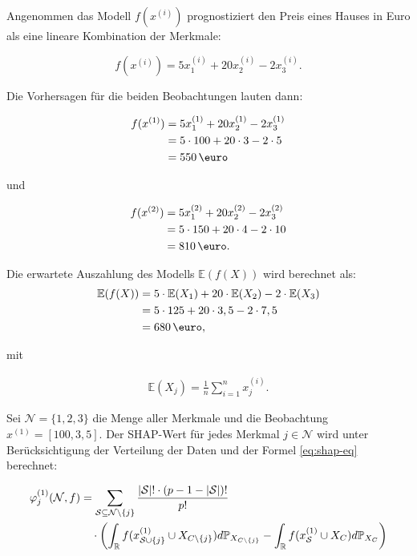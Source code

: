 Angenommen das Modell $f(x^{(i)})$ prognostiziert den Preis eines Hauses in Euro als eine lineare Kombination der Merkmale:

\begin{equation}
    f(x^{(i)}) = 5x_1^{(i)} + 20x_2^{(i)} - 2x_3^{(i)}.
\end{equation}

Die Vorhersagen für die beiden Beobachtungen lauten dann:

\begin{align}
    \label{eq:fx1}
    f(x^{(1)}) &= 5x_1^{(1)} + 20x_2^{(1)} - 2x_3^{(1)} \\ \notag
        &= 5 \cdot 100 + 20 \cdot 3 - 2 \cdot 5 \\ \notag
        &= 550\,\text{\euro} 
\end{align}

und 

\begin{align}
    f(x^{(2)}) &= 5x_1^{(2)} + 20x_2^{(2)} - 2x_3^{(2)} \\ \notag
        &= 5 \cdot 150 + 20 \cdot 4 - 2 \cdot 10 \\ \notag
        &= 810\,\text{\euro}. 
\end{align}

Die erwartete Auszahlung des Modells $\mathbb{E}(f(X))$ wird berechnet als:
\begin{align}
    \label{eq:efx}
    \mathbb{E}(f(X)) &= 5 \cdot \mathbb{E}(X_1) + 20 \cdot \mathbb{E}(X_2) - 2 \cdot \mathbb{E}(X_3) \\ \notag
                     &= 5 \cdot 125 + 20 \cdot 3,5 - 2 \cdot 7,5 \\ \notag
                     &= 680 \,\text{\euro},
\end{align}

mit 

\begin{align}
    \label{eq:e}
    \mathbb{E}(X_j) = \frac{1}{n} \sum_{i=1}^{n} x_j^{(i)}.
\end{align}     

Sei $\mathcal{N} = \{1, 2, 3\}$ die Menge aller Merkmale und die Beobachtung $x^{(1)} = [100, 3, 5]$. 
Der SHAP-Wert für jedes Merkmal $j \in \mathcal{N}$ wird unter Berücksichtigung der Verteilung der 
Daten und der Formel \ref{eq:shap-eq} berechnet:

\begin{align}
    \label{eq:shap-formular}
    \varphi^{(1)}_{j} (\mathcal{N}, f) &= \sum_{\mathcal{S} \subseteq \mathcal{N} \setminus \{j\}} \frac{|\mathcal{S}|! \cdot (p - 1 - |\mathcal{S}|)!}{p!} \\ \notag
    &\quad \cdot \left( \int_{\mathbb{R}} f(x^{(1)}_{\mathcal{S} \cup \{j\}} \cup X_{C \setminus \{j\}}) d\mathbb{P}_{X_{C \setminus \{j\}}} -
    \int_{\mathbb{R}} f(x^{(1)}_{\mathcal{S}} \cup X_{C}) d\mathbb{P}_{X_{C}} \right) 
\end{align}

